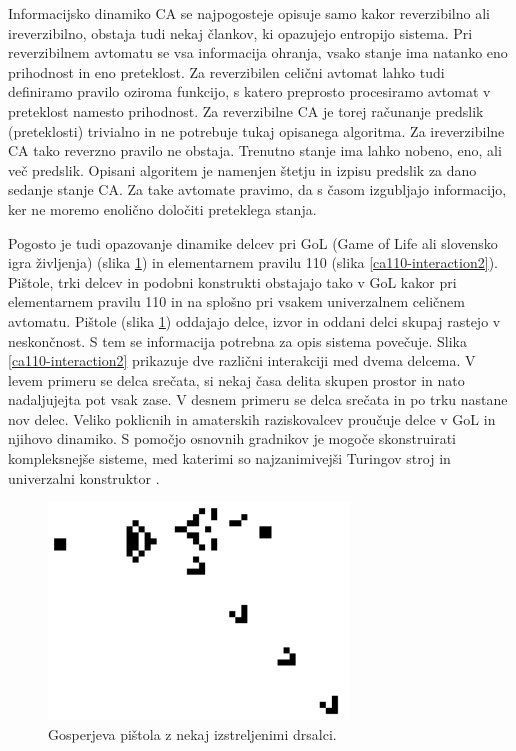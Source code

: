 \documentclass[12pt,a4paper,openany,twoside]{book}
\begin{document}
Informacijsko dinamiko CA se najpogosteje opisuje samo kakor reverzibilno ali ireverzibilno,
obstaja tudi nekaj člankov, ki opazujejo entropijo sistema.
Pri reverzibilnem avtomatu se vsa informacija ohranja, vsako stanje ima natanko eno prihodnost in eno preteklost.
Za reverzibilen celični avtomat lahko tudi definiramo pravilo oziroma funkcijo,
s katero preprosto procesiramo avtomat v preteklost namesto prihodnost.
Za reverzibilne CA je torej računanje predslik (preteklosti)
trivialno in ne potrebuje tukaj opisanega algoritma.
Za ireverzibilne CA tako reverzno pravilo ne obstaja.
Trenutno stanje ima lahko nobeno, eno, ali več predslik.
Opisani algoritem je namenjen štetju in izpisu predslik za dano sedanje stanje CA.
Za take avtomate pravimo, da s časom izgubljajo informacijo,
ker ne moremo enolično določiti preteklega stanja.

Pogosto je tudi opazovanje dinamike delcev pri GoL (Game of Life \cite{WikiGoL} ali slovensko igra življenja) (slika \ref{gospers_glider_gun})
in elementarnem pravilu 110 \cite{WikiRule110} (slika \ref{ca110-interaction2}).
Pištole, trki delcev in podobni konstrukti obstajajo tako v GoL kakor pri elementarnem pravilu 110
in na splošno pri vsakem univerzalnem celičnem avtomatu.
Pištole (slika \ref{gospers_glider_gun}) oddajajo delce, izvor in oddani delci skupaj rastejo v neskončnost.
S tem se informacija potrebna za opis sistema povečuje.
Slika \ref{ca110-interaction2} prikazuje dve različni interakciji med dvema delcema.
V levem primeru se delca srečata, si nekaj časa delita skupen prostor in nato nadaljujejta pot vsak zase.
V desnem primeru se delca srečata in po trku nastane nov delec.
Veliko poklicnih in amaterskih raziskovalcev proučuje delce v GoL in njihovo dinamiko.
S pomočjo osnovnih gradnikov je mogoče skonstruirati kompleksnejše sisteme, med katerimi so
najzanimivejši Turingov stroj \cite{Rendell2001} in univerzalni konstruktor \cite{Greene2013}.

\begin{figure}[htb]
\centerline{\includegraphics[width=8cm]{gospers_glider_gun}}
\caption[Gosperjeva pištola.]
{Gosperjeva pištola z nekaj izstreljenimi drsalci.}
\label{gospers_glider_gun}
\end{figure}
\end{document}
